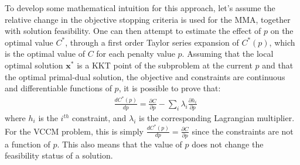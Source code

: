   To develop some mathematical intuition for this approach, let's assume the relative change in the objective stopping criteria is used for the MMA, together with solution feasibility. One can then attempt to estimate the effect of $p$ on the optimal value $C^*$, through a first order Taylor series expansion of $C^*(p)$, which is the optimal value of $C$ for each penalty value $p$. Assuming that the local optimal solution $\bm{x}^*$ is a KKT point of the subproblem at the current $p$ and that the optimal primal-dual solution, the objective and constraints are continuous and differentiable functions of $p$, it is possible to prove that:
  \begin{align} \label{eqn:fullderivative}
    & \frac{dC^*(p)}{dp} = \frac{\partial C}{\partial p} - \sum_i{\lambda_i \frac{\partial h_i}{\partial p}}
  \end{align}
  where $h_i$ is the $i^{th}$ constraint, and $\lambda_i$ is the corresponding Lagrangian multiplier. For the VCCM problem, this is simply $\frac{dC^*(p)}{dp} = \frac{\partial C}{\partial p}$ since the constraints are not a function of $p$. This also means that the value of $p$ does not change the feasibility status of a solution.

